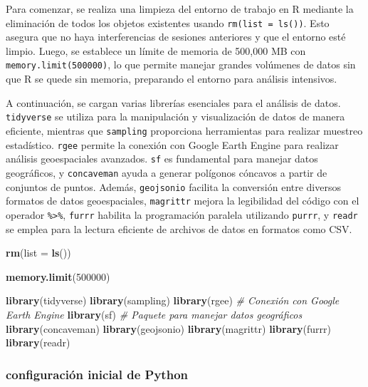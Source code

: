 \documentclass[
  12pt,
]{book}
\newenvironment{Shaded}{\begin{snugshade}}{\end{snugshade}}
\newcommand{\AttributeTok}[1]{\textcolor[rgb]{0.13,0.29,0.53}{#1}}
\newcommand{\CommentTok}[1]{\textcolor[rgb]{0.56,0.35,0.01}{\textit{#1}}}
\newcommand{\DecValTok}[1]{\textcolor[rgb]{0.00,0.00,0.81}{#1}}
\newcommand{\FunctionTok}[1]{\textcolor[rgb]{0.13,0.29,0.53}{\textbf{#1}}}
\newcommand{\NormalTok}[1]{#1}
\begin{document}
Para comenzar, se realiza una limpieza del entorno de trabajo en R mediante la eliminación de todos los objetos existentes usando \texttt{rm(list\ =\ ls())}. Esto asegura que no haya interferencias de sesiones anteriores y que el entorno esté limpio. Luego, se establece un límite de memoria de 500,000 MB con \texttt{memory.limit(500000)}, lo que permite manejar grandes volúmenes de datos sin que R se quede sin memoria, preparando el entorno para análisis intensivos.

A continuación, se cargan varias librerías esenciales para el análisis de datos. \texttt{tidyverse} se utiliza para la manipulación y visualización de datos de manera eficiente, mientras que \texttt{sampling} proporciona herramientas para realizar muestreo estadístico. \texttt{rgee} permite la conexión con Google Earth Engine para realizar análisis geoespaciales avanzados. \texttt{sf} es fundamental para manejar datos geográficos, y \texttt{concaveman} ayuda a generar polígonos cóncavos a partir de conjuntos de puntos. Además, \texttt{geojsonio} facilita la conversión entre diversos formatos de datos geoespaciales, \texttt{magrittr} mejora la legibilidad del código con el operador \texttt{\%\textgreater{}\%}, \texttt{furrr} habilita la programación paralela utilizando \texttt{purrr}, y \texttt{readr} se emplea para la lectura eficiente de archivos de datos en formatos como CSV.

\begin{Shaded}
\begin{Highlighting}[]
\FunctionTok{rm}\NormalTok{(}\AttributeTok{list =} \FunctionTok{ls}\NormalTok{())}

\FunctionTok{memory.limit}\NormalTok{(}\DecValTok{500000}\NormalTok{)}

\FunctionTok{library}\NormalTok{(tidyverse)}
\FunctionTok{library}\NormalTok{(sampling)}
\FunctionTok{library}\NormalTok{(rgee) }\CommentTok{\# Conexión con Google Earth Engine}
\FunctionTok{library}\NormalTok{(sf) }\CommentTok{\# Paquete para manejar datos geográficos}
\FunctionTok{library}\NormalTok{(concaveman)}
\FunctionTok{library}\NormalTok{(geojsonio)}
\FunctionTok{library}\NormalTok{(magrittr)}
\FunctionTok{library}\NormalTok{(furrr)}
\FunctionTok{library}\NormalTok{(readr)}
\end{Highlighting}
\end{Shaded}

\hypertarget{configuraciuxf3n-inicial-de-python}{%
\subsubsection*{configuración inicial de Python}\label{configuraciuxf3n-inicial-de-python}}
\end{document}
